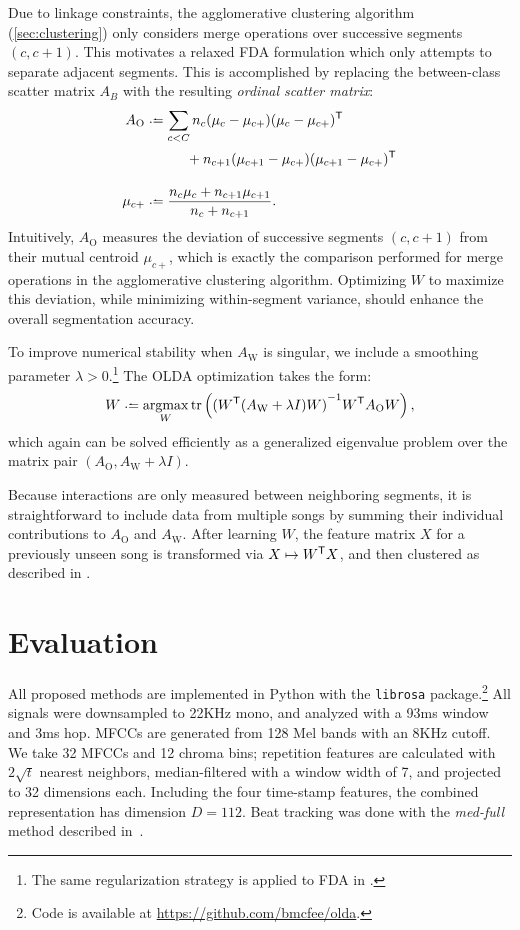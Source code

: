 \documentclass{article}
\begin{document}
Due to linkage constraints, the agglomerative clustering algorithm (\cref{sec:clustering}) only considers merge 
operations over successive segments $(c, c+1)$. This motivates a relaxed FDA formulation which only attempts to separate adjacent
segments.  This is accomplished by replacing the between-class scatter matrix $A_B$ with the resulting \emph{ordinal scatter matrix}:
\begin{align*}
A_\text{O} &\defeq \sum_{c < C} n_c (\mu_c - \mu_{c+}) (\mu_c - \mu_{c+})\trans\\
            &\phantom{\defeq \sum_{c < C}} + n_{c+1} (\mu_{c+1} - \mu_{c+}) (\mu_{c+1} - \mu_{c+})\trans\\
\mu_{c+} &\defeq \frac{n_c \mu_c + n_{c+1} \mu_{c+1} }{n_c + n_{c+1}}.
\end{align*}
Intuitively, $A_\text{O}$ measures the deviation of successive segments $(c, c+1)$ from their mutual centroid $\mu_{c+}$, 
which is exactly the comparison performed for merge operations in the agglomerative clustering algorithm.
Optimizing $W$ to maximize this deviation, while minimizing within-segment variance, should enhance the overall segmentation accuracy.  

To improve numerical stability when $A_\text{W}$ is singular, we include a smoothing parameter
$\lambda > 0$.\footnote{The same regularization strategy is applied to FDA in .} 
The OLDA optimization takes the form:
\begin{equation}
W \defeq \argmax_W \trace\left( {(W\trans (A_\text{W} + \lambda I) W)}^{-1} W\trans A_\text{O} W \right) \label{eq:olda},
\end{equation}
which again can be solved efficiently as a generalized eigenvalue problem over the matrix pair 
$(A_\text{O}, A_\text{W} + \lambda I)$.

Because interactions are only measured between neighboring segments, it is 
straightforward to include data from multiple songs by summing their individual contributions to $A_\text{O}$ and $A_\text{W}$.
After learning $W$, the feature matrix $X$ for a previously unseen song is transformed via $X \mapsto W^\mathsf{T} X$, and then 
clustered as described in .

\section{Evaluation}
\label{sec:eval}
All proposed methods are implemented in Python with the \texttt{librosa} package.\footnote{Code is
available at \url{https://github.com/bmcfee/olda}.}  
All signals were downsampled to 22KHz mono, and analyzed with a 93ms window and 3ms hop.  MFCCs are generated from 128 Mel bands
with an 8KHz cutoff. We take 32 MFCCs and 12 chroma bins; repetition features are calculated with $2\sqrt{t}$ nearest neighbors,
median-filtered with a window width of 7, and projected to 32 dimensions each.  Including the four time-stamp features, the combined
representation has dimension $D=112$. Beat tracking was done with the \emph{med-full} method described in~\cite{mcfee2014beat}.
\end{document}
